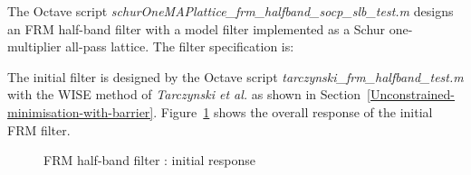 \documentclass[a4paper,twoside,10pt,english]{report}
\begin{document}
The Octave script
\emph{schurOneMAPlattice\_frm\_halfband\_socp\_slb\_test.m} designs an FRM
half-band filter with a model filter implemented as a Schur
one-multiplier all-pass lattice. The filter specification is:
\begin{small}

\end{small}
The initial filter is designed by the Octave script
\emph{tarczynski\_frm\_halfband\_test.m} with the WISE method of
\emph{Tarczynski et al.} as shown in
Section~\ref{Unconstrained-minimisation-with-barrier}.
Figure~\ref{fig:schurOneMAPlattice-frm-half-band-initial-response} shows the
overall response of the initial FRM filter.
\begin{figure}[!htbp]
\begin{center}
\scalebox{0.7}{}
\caption{FRM half-band filter : initial response}
\label{fig:schurOneMAPlattice-frm-half-band-initial-response}
\end{center}
\end{figure}
\end{document}
